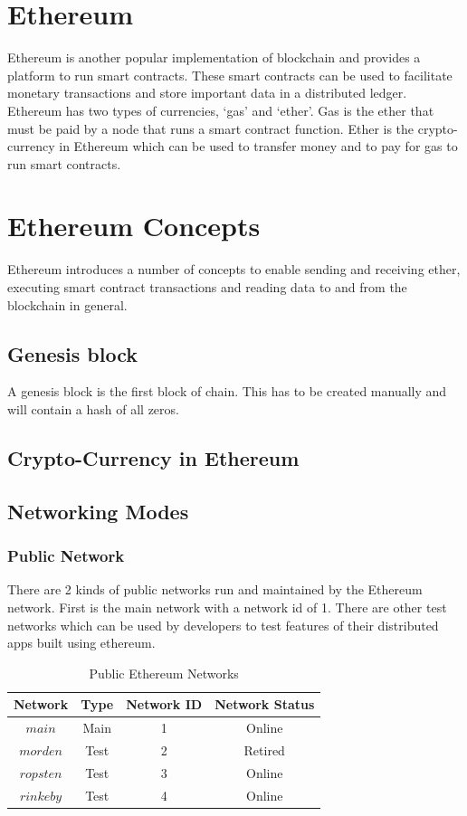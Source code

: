 \documentclass[11pt,openright]{report}
\begin{document}
\section{Ethereum}
Ethereum is another popular implementation of blockchain and provides a platform to run smart contracts. These smart contracts can be used to facilitate monetary transactions and store important data in a distributed ledger. Ethereum has two types of currencies, ‘gas’ and ‘ether’. Gas is the ether that must be paid by a node that runs a smart contract function. Ether is the crypto-currency in Ethereum which can be used to transfer money and to pay for gas to run smart contracts.

\section{Ethereum Concepts}
Ethereum introduces a number of concepts to enable sending and receiving ether, executing smart contract transactions and reading data to and from the blockchain in general.

\subsection{Genesis block}
A genesis block is the first block of chain. This has to be created manually and will contain a hash of all zeros.

\subsection{Crypto-Currency in Ethereum}


\subsection{Networking Modes}
\subsubsection{Public Network}
There are 2 kinds of public networks run and maintained by the Ethereum network. 
First is the main network with a network id of 1. There are other test networks which can be used by developers to test features of their distributed apps built using ethereum.

\begin{table}[!htbp]
	\renewcommand{\arraystretch}{1.3}
	\caption{Public Ethereum Networks}
	\label{pub_eth_networks}
	\centering
	\begin{tabular}{|c||c|c|c|}
		\hline
		\bfseries Network & \bfseries Type & \bfseries Network ID & \bfseries Network Status \\
		\hline\hline
		$main$ & Main & 1 & Online \\ \hline
		$morden$ & Test & 2 & Retired \\ \hline
		$ropsten$ & Test & 3 & Online \\ \hline
		$rinkeby$ & Test & 4 & Online \\ \hline

	\end{tabular}
\end{table}
\end{document}
